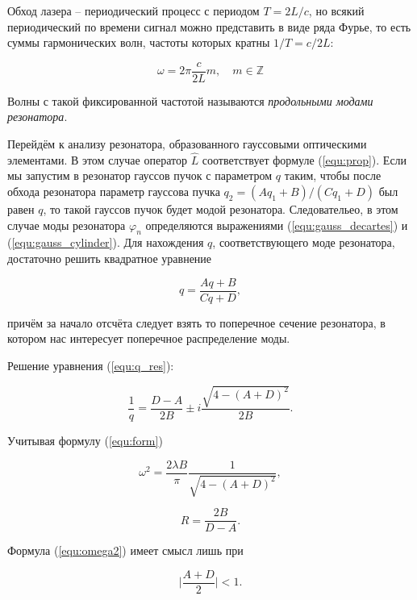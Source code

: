 \documentclass[a4paper,12pt]{article}
\begin{document}
Обход лазера -- периодический процесс с периодом $T = 2L/c$, но всякий периодический по времени сигнал можно представить в виде ряда Фурье, то есть суммы гармонических волн, частоты которых кратны $1/T = c/2L$:

\begin{equation}
    \omega = 2\pi \frac{c}{2L}m,\quad m\in\mathbb{Z}
\end{equation}

Волны с такой фиксированной частотой называются \textit{продольными модами резонатора}.

Перейдём к анализу резонатора, образованного гауссовыми оптическими элементами. В этом случае оператор $\hat{L}$ соответствует формуле (\ref{equ:prop}). Если мы запустим в резонатор гауссов пучок с параметром $q$ таким, чтобы после обхода резонатора параметр гауссова пучка $q_2 = (Aq_1 + B)/(Cq_1 + D)$ был равен $q$, то такой гауссов пучок будет модой резонатора. Следовательео, в этом случае моды резонатора $\varphi_n$ определяются выражениями (\ref{equ:gauss_decartes}) и (\ref{equ:gauss_cylinder}). Для нахождения $q$, соответствующего моде резонатора, достаточно решить квадратное уравнение

\begin{equation}
    q = \frac{Aq + B}{Cq + D},
    \label{equ:q_res}
\end{equation}

причём за начало отсчёта следует взять то поперечное сечение резонатора, в котором нас интересует поперечное распределение моды.

Решение уравнения (\ref{equ:q_res}):

\begin{equation}
    \frac{1}{q} = \frac{D - A}{2B} \pm i\frac{\sqrt{4 - (A + D)^2}}{2B}.
\end{equation}

Учитывая формулу (\ref{equ:form})

\begin{equation}
    \omega^2 = \frac{2\lambda B}{\pi}\frac{1}{\sqrt{4 - (A + D)^2}},
    \label{equ:omega2}
\end{equation}

\begin{equation}
    R = \frac{2B}{D - A}.
    \label{equ:r}
\end{equation}

Формула (\ref{equ:omega2}) имеет смысл лишь при

\begin{equation}
    \Bigr|\frac{A + D}{2}\Bigr| < 1.
\end{equation}
\end{document}
